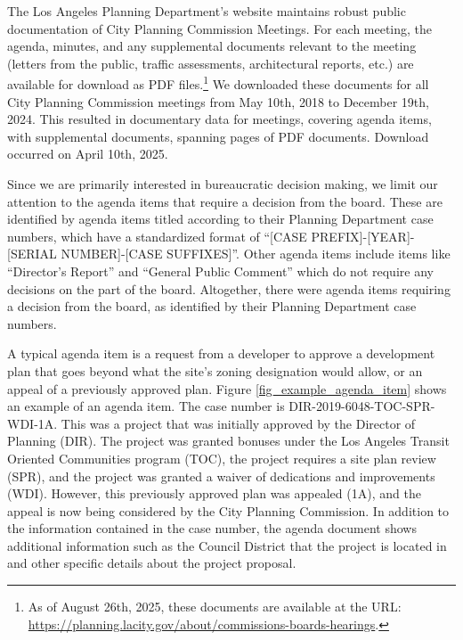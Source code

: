 The Los Angeles Planning Department's website maintains robust public documentation of City Planning Commission Meetings. For each meeting, the agenda, minutes, and any supplemental documents relevant to the meeting (letters from the public, traffic assessments, architectural reports, etc.) are available for download as PDF files.\footnote{As of August 26th, 2025, these documents are available at the URL: \url{https://planning.lacity.gov/about/commissions-boards-hearings}.} We downloaded these documents for all City Planning Commission meetings from May 10th, 2018 to December 19th, 2024. This resulted in documentary data for  meetings, covering  agenda items, with  supplemental documents, spanning  pages of PDF documents. Download occurred on April 10th, 2025.

Since we are primarily interested in bureaucratic decision making, we limit our attention to the agenda items that require a decision from the board. These are identified by agenda items titled according to their Planning Department case numbers, which have a standardized format of ``[CASE PREFIX]-[YEAR]-[SERIAL NUMBER]-[CASE SUFFIXES]''. Other agenda items include items like ``Director's Report'' and ``General Public Comment'' which do not require any decisions on the part of the board. Altogether, there were  agenda items requiring a decision from the board, as identified by their Planning Department case numbers.

A typical agenda item is a request from a developer to approve a development plan that goes beyond what the site's zoning designation would allow, or an appeal of a previously approved plan. Figure \ref{fig_example_agenda_item} shows an example of an agenda item. The case number is DIR-2019-6048-TOC-SPR-WDI-1A. This was a project that was initially approved by the Director of Planning (DIR). The project was granted bonuses under the Los Angeles Transit Oriented Communities program (TOC), the project requires a site plan review (SPR), and the project was granted a waiver of dedications and improvements (WDI). However, this previously approved plan was appealed (1A), and the appeal is now being considered by the City Planning Commission. In addition to the information contained in the case number, the agenda document shows additional information such as the Council District that the project is located in and other specific details about the project proposal.

